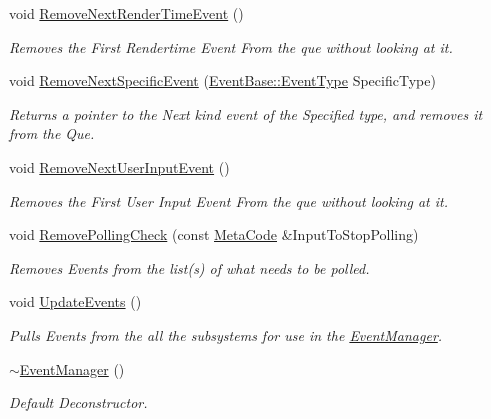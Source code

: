 \begin{DoxyCompactItemize}
void \hyperlink{classphys_1_1EventManager_af1204912be3554312e66d3a777c1f99b}{RemoveNextRenderTimeEvent} ()
\begin{DoxyCompactList}\small\item\em Removes the First Rendertime Event From the que without looking at it. \item\end{DoxyCompactList}\item 
void \hyperlink{classphys_1_1EventManager_a486c1173a2c1a64885bfdbe7ca267611}{RemoveNextSpecificEvent} (\hyperlink{classphys_1_1EventBase_a5e6a8564e127f654123f0bf6a2751923}{EventBase::EventType} SpecificType)
\begin{DoxyCompactList}\small\item\em Returns a pointer to the Next kind event of the Specified type, and removes it from the Que. \item\end{DoxyCompactList}\item 
void \hyperlink{classphys_1_1EventManager_add41b5f4d2942461bcaf40a97ad40b09}{RemoveNextUserInputEvent} ()
\begin{DoxyCompactList}\small\item\em Removes the First User Input Event From the que without looking at it. \item\end{DoxyCompactList}\item 
void \hyperlink{classphys_1_1EventManager_adaf7d5346932506ed43f893eb071fd39}{RemovePollingCheck} (const \hyperlink{classphys_1_1MetaCode}{MetaCode} \&InputToStopPolling)
\begin{DoxyCompactList}\small\item\em Removes Events from the list(s) of what needs to be polled. \item\end{DoxyCompactList}\item 
void \hyperlink{classphys_1_1EventManager_a63cf23dc9fe0ced3e2c60ca61c97b166}{UpdateEvents} ()
\begin{DoxyCompactList}\small\item\em Pulls Events from the all the subsystems for use in the \hyperlink{classphys_1_1EventManager}{EventManager}. \item\end{DoxyCompactList}\item 
\hyperlink{classphys_1_1EventManager_aa6df8df9b7a11dadcd9bc79ecdf54558}{$\sim$EventManager} ()
\begin{DoxyCompactList}\small\item\em Default Deconstructor. \item\end{DoxyCompactList}\end{DoxyCompactItemize}
